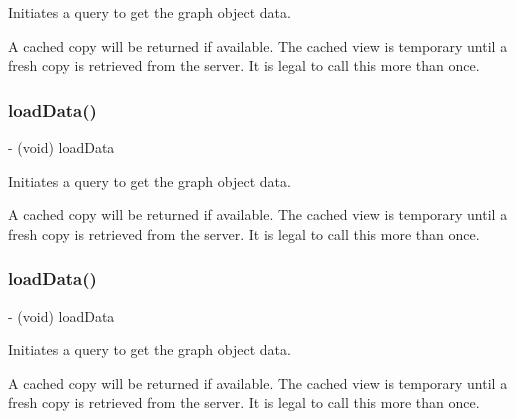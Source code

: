 Initiates a query to get the graph object data.

A cached copy will be returned if available. The cached view is temporary until a fresh copy is retrieved from the server. It is legal to call this more than once. \mbox{\label{interfaceFBGraphObjectPickerViewController_ad2679fd3904b7d46c40a9c861cd468dc}} 
\subsubsection{\texorpdfstring{load\+Data()}{loadData()}\hspace{0.1cm}{\footnotesize\ttfamily [4/5]}}
{\footnotesize\ttfamily -\/ (void) load\+Data \begin{DoxyParamCaption}{ }\end{DoxyParamCaption}}

Initiates a query to get the graph object data.

A cached copy will be returned if available. The cached view is temporary until a fresh copy is retrieved from the server. It is legal to call this more than once. \mbox{\label{interfaceFBGraphObjectPickerViewController_ad2679fd3904b7d46c40a9c861cd468dc}} 
\subsubsection{\texorpdfstring{load\+Data()}{loadData()}\hspace{0.1cm}{\footnotesize\ttfamily [5/5]}}
{\footnotesize\ttfamily -\/ (void) load\+Data \begin{DoxyParamCaption}{ }\end{DoxyParamCaption}}

Initiates a query to get the graph object data.

A cached copy will be returned if available. The cached view is temporary until a fresh copy is retrieved from the server. It is legal to call this more than once. \mbox{\label{interfaceFBGraphObjectPickerViewController_a4553f2ebea1891b75c18551c7a9cefc5}} 
